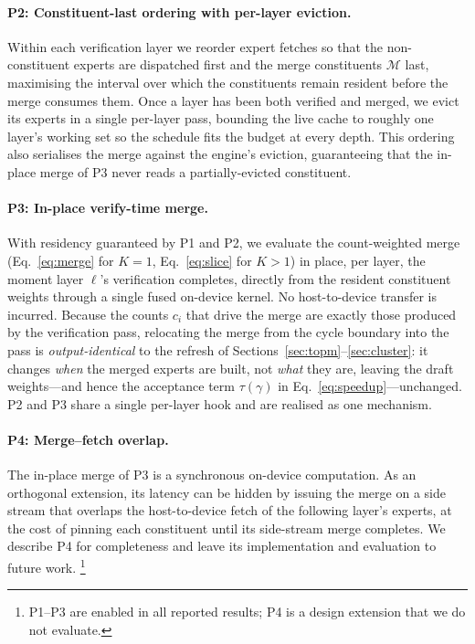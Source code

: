 \paragraph{P2: Constituent-last ordering with per-layer eviction.}
Within each verification layer we reorder expert fetches so that the
non-constituent experts are dispatched first and the merge constituents
$\mathcal{M}$ last, maximising the interval over which the constituents remain
resident before the merge consumes them. Once a layer has been both verified and
merged, we evict its experts in a single per-layer pass, bounding the live cache
to roughly one layer's working set so the schedule fits the budget at every
depth. This ordering also serialises the merge against the engine's eviction,
guaranteeing that the in-place merge of P3 never reads a partially-evicted
constituent.

\paragraph{P3: In-place verify-time merge.}
With residency guaranteed by P1 and P2, we evaluate the count-weighted merge
(Eq.~\eqref{eq:merge} for $K{=}1$, Eq.~\eqref{eq:slice} for $K{>}1$) in place,
per layer, the moment layer $\ell$'s verification completes, directly from the
resident constituent weights through a single fused on-device kernel. No
host-to-device transfer is incurred. Because the counts $c_i$ that drive the
merge are exactly those produced by the verification pass, relocating the merge
from the cycle boundary into the pass is \emph{output-identical} to the refresh
of Sections~\ref{sec:topm}--\ref{sec:cluster}: it changes \emph{when} the merged
experts are built, not \emph{what} they are, leaving the draft weights---and hence
the acceptance term $\tau(\gamma)$ in Eq.~\eqref{eq:speedup}---unchanged. P2 and
P3 share a single per-layer hook and are realised as one mechanism.

\paragraph{P4: Merge--fetch overlap.}
The in-place merge of P3 is a synchronous on-device computation. As an orthogonal
extension, its latency can be hidden by issuing the merge on a side stream that
overlaps the host-to-device fetch of the following layer's experts, at the cost
of pinning each constituent until its side-stream merge completes. We describe P4
for completeness and leave its implementation and evaluation to future work.%
\footnote{P1--P3 are enabled in all reported results; P4 is a design extension
that we do not evaluate.}

